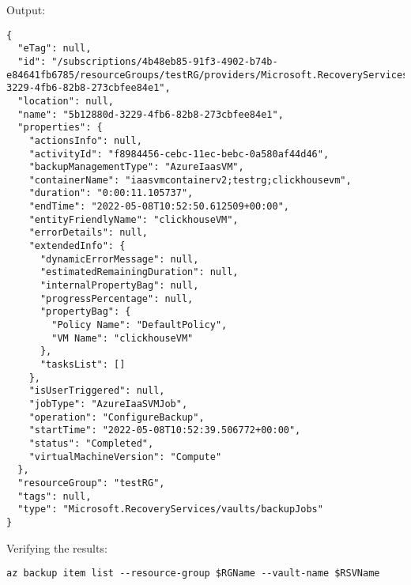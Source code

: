 Output:
\begin{verbatim}
{
  "eTag": null,
  "id": "/subscriptions/4b48eb85-91f3-4902-b74b-e84641fb6785/resourceGroups/testRG/providers/Microsoft.RecoveryServices/vaults/myRSV/backupJobs/5b12880d-3229-4fb6-82b8-273cbfee84e1",
  "location": null,
  "name": "5b12880d-3229-4fb6-82b8-273cbfee84e1",
  "properties": {
    "actionsInfo": null,
    "activityId": "f8984456-cebc-11ec-bebc-0a580af44d46",
    "backupManagementType": "AzureIaasVM",
    "containerName": "iaasvmcontainerv2;testrg;clickhousevm",
    "duration": "0:00:11.105737",
    "endTime": "2022-05-08T10:52:50.612509+00:00",
    "entityFriendlyName": "clickhouseVM",
    "errorDetails": null,
    "extendedInfo": {
      "dynamicErrorMessage": null,
      "estimatedRemainingDuration": null,
      "internalPropertyBag": null,
      "progressPercentage": null,
      "propertyBag": {
        "Policy Name": "DefaultPolicy",
        "VM Name": "clickhouseVM"
      },
      "tasksList": []
    },
    "isUserTriggered": null,
    "jobType": "AzureIaaSVMJob",
    "operation": "ConfigureBackup",
    "startTime": "2022-05-08T10:52:39.506772+00:00",
    "status": "Completed",
    "virtualMachineVersion": "Compute"
  },
  "resourceGroup": "testRG",
  "tags": null,
  "type": "Microsoft.RecoveryServices/vaults/backupJobs"
}
\end{verbatim}

Verifying the results:
\begin{verbatim}
az backup item list --resource-group $RGName --vault-name $RSVName
\end{verbatim}

